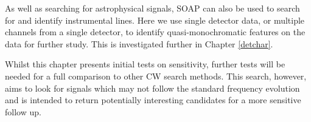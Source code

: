 As well as searching for astrophysical signals, SOAP can also be used to search for and identify instrumental lines. Here we use single detector data, or multiple channels from a single detector, to identify quasi-monochromatic features on the data for further study. This is investigated further in Chapter \ref{detchar}.

Whilst this chapter presents initial tests on sensitivity, further tests will be needed for a full comparison to other \gls{CW} search methods.  
This search, however, aims to look for signals which may not follow the standard
frequency evolution and is intended to return potentially interesting
candidates for a more sensitive follow up.


